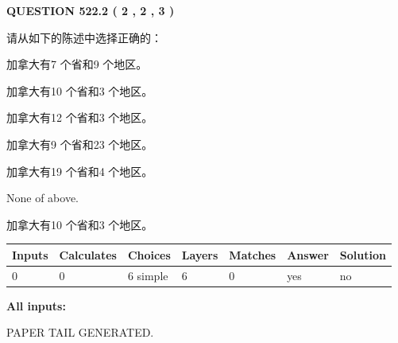 \documentclass{ctexart}
\begin{document}
   
  
\vspace{0.2in}
  
{\textbf{\Large{QUESTION
522.2 
 ( 2 , 2 , 3 )
}}}
  
  
请从如下的陈述中选择正确的：
 
 
加拿大有7 个省和9 个地区。
 
 
加拿大有10 个省和3 个地区。
 
 
加拿大有12 个省和3 个地区。
 
 
加拿大有9 个省和23 个地区。
 
 
加拿大有19 个省和4 个地区。
 
 
 None of above.
 
 
\noindent{}
 
 
加拿大有10 个省和3 个地区。
 
 
\noindent{}
 
 
   
   
   
   
\noindent\begin{tabular}{|l|l|l|l|l|l|l|}
 \hline
Inputs & Calculates & Choices & Layers & Matches & Answer & Solution \\ \hline
 0  & 
 0  & 
 6
  simple  
  & 
 6  & 
 0  & 
  yes & 
  no 
  \\ \hline
 \end{tabular}
   
   
   
   
\noindent{}
   
   
   
   
\noindent\vspace{0.1in}\hspace{-0.08in} {\textbf{\Large{All inputs: }}}
   
   
   
   
   
   
 \vspace{0.2in}
 
   
   
\vspace{2.0in} PAPER TAIL GENERATED.
   
\end{document}
